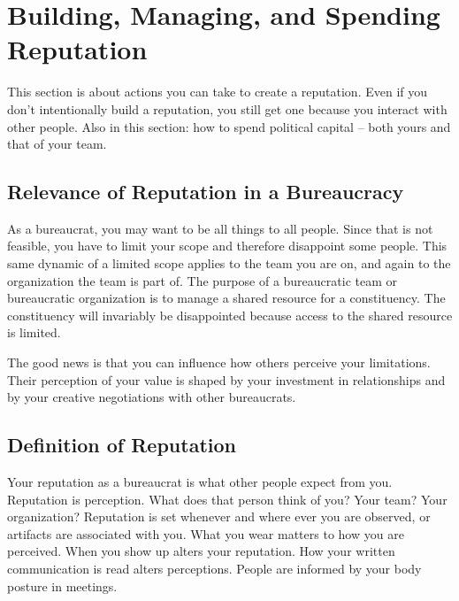 \section{Building, Managing, and Spending Reputation\label{sec:reputation}}




This section is about actions you can take to create a reputation. Even if you don't intentionally build a reputation, you still get one because you interact with other people. Also in this section: how to spend political capital -- both yours and that of your team. 

\subsection*{Relevance of Reputation in a Bureaucracy}

As a bureaucrat, you may want to be all things to all people. Since that is not feasible, you have to limit your scope and therefore disappoint some people. This same dynamic of a limited scope applies to the team you are on, and again to the organization the team is part of. The purpose of a bureaucratic team or bureaucratic organization is to manage a \gls{shared resource} for a constituency. The constituency will invariably be disappointed because access to the shared resource is limited. 

The good news is that you can influence how others perceive your limitations. Their perception of your value is shaped by your investment in relationships and by your creative negotiations with other bureaucrats. %

\subsection*{Definition of Reputation}

Your \gls{reputation} as a bureaucrat is what other people expect from you. \iftoggle{glossaryinmargin}{\marginpar{[Glossary]}}{}
Reputation is perception. What does that person think of you? Your team? Your organization? 
Reputation is set whenever and where ever you are observed, or artifacts are associated with you. 
What you wear matters to how you are perceived. When you show up alters your reputation. How your written communication is read alters perceptions. People are informed by your body posture in meetings. 

